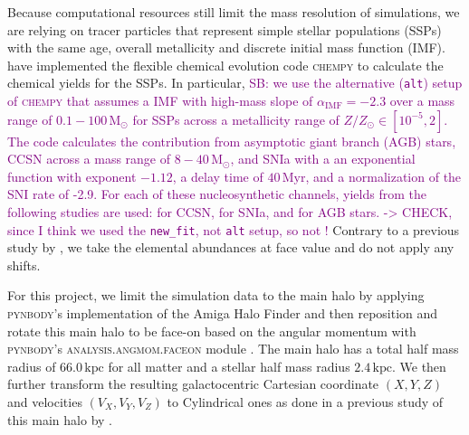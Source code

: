 \documentclass[fleqn,usenatbib]{mnras}
\newcommand{\SB}[1]{{\textcolor{purple}{SB: #1}}}
\begin{document}
Because computational resources still limit the mass resolution of simulations, we are relying on tracer particles that represent simple stellar populations (SSPs) with the same age, overall metallicity and discrete initial mass function (IMF). \citet{Buck2021} have implemented the flexible chemical evolution code \textsc{chempy} \citep{Rybizki2017} to calculate the chemical yields for the SSPs. In particular, \SB{we use the alternative (\texttt{alt}) setup of \textsc{chempy} that assumes a \citet{Chabrier2003} IMF with high-mass slope of $\alpha_\text{IMF} = -2.3$ over a mass range of $0.1-100\,\mathrm{M_\odot}$ for SSPs across a metallicity range of $Z/Z_\odot \in [10^{-5},2]$. The code calculates the contribution from asymptotic giant branch (AGB) stars, CCSN across a mass range of $8-40\,\mathrm{M_\odot}$, and SNIa with a an exponential function with exponent $-1.12$, a delay time of $40\,\mathrm{Myr}$, and a normalization of the SNI rate of -2.9. For each of these nucleosynthetic channels, yields from the following studies are used: \citet{Limongi2018} for CCSN, \citet{Seitenzahl2013} for SNIa, and \citet{Karakas2016} for AGB stars. -> CHECK, since I think we used the \texttt{new\_fit}, not \texttt{alt} setup, so \citet{Chieffi2004} not \citet{Limongi2018}!} Contrary to a previous study by \citet{Buder2024}, we take the elemental abundances at face value and do not apply any shifts.

For this project, we limit the simulation data to the main halo by applying \textsc{pynbody}'s implementation of the Amiga Halo Finder \citep{Knollman2009} and then reposition and rotate this main halo to be face-on based on the angular momentum with \textsc{pynbody}'s \textsc{analysis.angmom.faceon} module \citep{pynbody}. The main halo has a total half mass radius of $66.0\,\mathrm{kpc}$ for all matter and a stellar half mass radius $2.4\,\mathrm{kpc}$. We then further transform the resulting galactocentric Cartesian coordinate $(X,Y,Z)$ and velocities $(V_X,V_Y,V_Z)$ to Cylindrical ones as done in a previous study of this main halo by \citet{Buder2024}.
\end{document}
